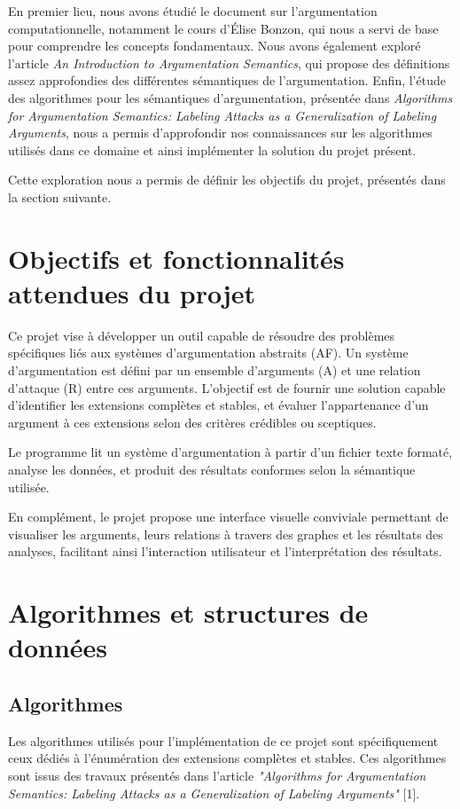 \documentclass{rapportECL}
\begin{document}
En premier lieu, nous avons étudié le document sur l'argumentation computationnelle, notamment le cours d'Élise Bonzon, qui nous a servi de base pour comprendre les concepts fondamentaux. 
Nous avons également exploré l'article \textit{An Introduction to Argumentation Semantics}, qui propose des définitions assez approfondies des différentes sémantiques de l'argumentation. 
Enfin, l’étude des algorithmes pour les sémantiques d'argumentation, présentée dans \textit{Algorithms for Argumentation Semantics: Labeling Attacks as a Generalization of Labeling Arguments}, 
nous a permis d’approfondir nos connaissances sur les algorithmes utilisés dans ce domaine et ainsi implémenter la solution du projet présent. 

Cette exploration nous a permis de définir les objectifs du projet, présentés dans la section suivante.

\section{Objectifs et fonctionnalités attendues du projet}
Ce projet vise à développer un outil capable de résoudre des problèmes spécifiques liés aux systèmes d'argumentation abstraits (AF). 
Un système d'argumentation est défini par un ensemble d'arguments (A) et une relation d'attaque (R) entre ces arguments. 
L'objectif est de fournir une solution capable d’identifier les extensions complètes et stables, et évaluer l’appartenance 
d’un argument à ces extensions selon des critères crédibles ou sceptiques.

Le programme lit un système d'argumentation à partir d'un fichier texte formaté, analyse les données, et produit des résultats conformes selon la sémantique utilisée. 


En complément, le projet propose une interface visuelle conviviale permettant de visualiser les arguments, leurs relations à travers des graphes et les résultats des analyses, facilitant ainsi l’interaction utilisateur et l’interprétation des résultats.

\section{Algorithmes et structures de données} 


\subsection{Algorithmes}
Les algorithmes utilisés pour l'implémentation de ce projet sont spécifiquement ceux dédiés à l'énumération des extensions complètes 
et stables. Ces algorithmes sont issus des travaux présentés dans l'article 
\textit{"Algorithms for Argumentation Semantics: Labeling Attacks as a Generalization of Labeling Arguments"} [1].
\end{document}

